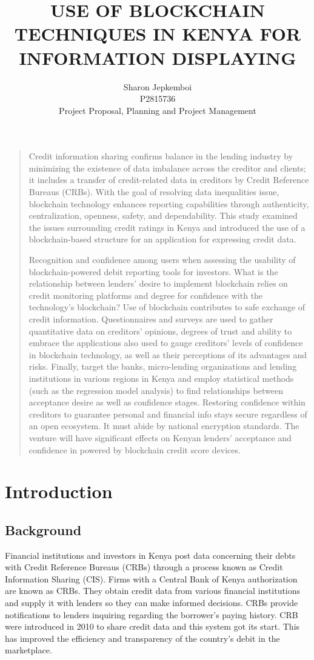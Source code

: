 \documentclass[a4paper]{article}
\title{USE OF BLOCKCHAIN TECHNIQUES IN KENYA FOR INFORMATION DISPLAYING}
\author{Sharon Jepkemboi \\
P2815736 \\
Project Proposal, Planning and Project Management}
\newenvironment{abstract}{
    \begin{center}
        \bfseries \abstractname
    \end{center}
    \begin{quote}
}{
    \end{quote}
}
\begin{document}
\maketitle

\begin{abstract}
Credit information sharing confirms balance in the lending industry by minimizing the existence of data imbalance across the creditor and clients; it includes a transfer of credit-related data in creditors by Credit Reference Bureaus (CRBs). With the goal of resolving data inequalities issue, blockchain technology enhances reporting capabilities through authenticity, centralization, openness, safety, and dependability. This study examined the issues surrounding credit ratings in Kenya and introduced the use of a blockchain-based structure for an application for expressing credit data.

Recognition and confidence among users when assessing the usability of blockchain-powered debit reporting tools for investors. What is the relationship between lenders' desire to implement blockchain relies on credit monitoring platforms and degree for confidence with the technology's blockchain? Use of blockchain contributes to safe exchange of credit information. Questionnaires and surveys are used to gather quantitative data on creditors' opinions, degrees of trust and ability to embrace the applications also used to gauge creditors' levels of confidence in blockchain technology, as well as their perceptions of its advantages and risks. Finally, target the banks, micro-lending organizations and lending institutions in various regions in Kenya and employ statistical methods (such as the regression model analysis) to find relationships between acceptance desire as well as confidence stages. Restoring confidence within creditors to guarantee personal and financial info stays secure regardless of an open ecosystem. It must abide by national encryption standards. The venture will have significant effects on Kenyan lenders' acceptance and confidence in powered by blockchain credit score devices.
\end{abstract}

\section{Introduction}

\subsection{Background}
Financial institutions and investors in Kenya post data concerning their debts with Credit Reference Bureaus (CRBs) through a process known as Credit Information Sharing (CIS). Firms with a Central Bank of Kenya authorization are known as CRBs. They obtain credit data from various financial institutions and supply it with lenders so they can make informed decisions. CRBs provide notifications to lenders inquiring regarding the borrower's paying history. CRB were introduced in 2010 to share credit data and this system got its start. This has improved the efficiency and transparency of the country's debit in the marketplace.
\end{document}
